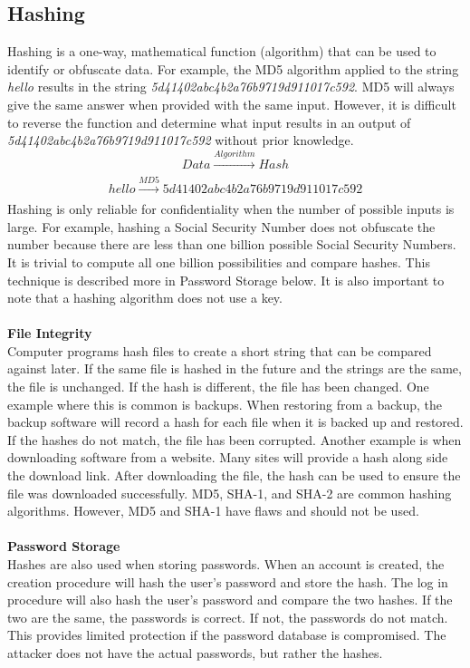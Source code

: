 \subsection{Hashing}
Hashing is a one-way, mathematical function (algorithm) that can be used to identify or obfuscate data. For example, the MD5 algorithm applied to the string \emph{hello} results in the string \emph{5d41402abc4b2a76b9719d911017c592}. MD5 will always give the same answer when provided with the same input. However, it is difficult to reverse the function and determine what input results in an output of \emph{5d41402abc4b2a76b9719d911017c592} without prior knowledge.
\begin{equation}
Data\xrightarrow[]{Algorithm} Hash
\end{equation}\begin{equation}
hello \xrightarrow[]{MD5} 5d41402abc4b2a76b9719d911017c592
\end{equation}
Hashing is only reliable for confidentiality when the number of possible inputs is large. For example, hashing a Social Security Number does not obfuscate the number because there are less than one billion possible Social Security Numbers. It is trivial to compute all one billion possibilities and compare hashes. This technique is described more in Password Storage below. It is also important to note that a hashing algorithm does not use a key.
\\\\\textbf{File Integrity}\\Computer programs hash files to create a short string that can be compared against later. If the same file is hashed in the future and the strings are the same, the file is unchanged. If the hash is different, the file has been changed. One example where this is common is backups. When restoring from a backup, the backup software will record a hash for each file when it is backed up and restored. If the hashes do not match, the file has been corrupted. Another example is when downloading software from a website. Many sites will provide a hash along side the download link. After downloading the file, the hash can be used to ensure the file was downloaded successfully. MD5, SHA-1, and SHA-2 are common hashing algorithms. However, MD5 and SHA-1 have flaws and should not be used.
\\\\\textbf{Password Storage}\\Hashes are also used when storing passwords. When an account is created, the creation procedure will hash the user's password and store the hash. The log in procedure will also hash the user's password and compare the two hashes. If the two are the same, the passwords is correct. If not, the passwords do not match. This provides limited protection if the password database is compromised. The attacker does not have the actual passwords, but rather the hashes.
